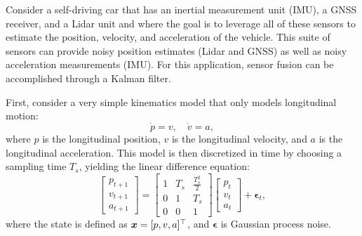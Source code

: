 \begin{example} \label{ex:car}
\theoremstyle{definition}
Consider a self-driving car that has an inertial measurement unit (IMU), a GNSS receiver, and a Lidar unit and where the goal is to leverage all of these sensors to estimate the position, velocity, and acceleration of the vehicle. This suite of sensors can provide noisy position estimates (Lidar and GNSS) as well as noisy acceleration measurements (IMU).
For this application, sensor fusion can be accomplished through a Kalman filter.

First, consider a very simple kinematics model that only models longitudinal motion:
\begin{equation*}
\dot{p} = v, \quad \dot{v} = a,
\end{equation*}
where $p$ is the longitudinal position, $v$ is the longitudinal velocity, and $a$ is the longitudinal acceleration. This model is then discretized in time by choosing a sampling time $T_s$, yielding the linear difference equation:
\begin{equation*}
\begin{bmatrix}
p_{t+1} \\ v_{t+1} \\ a_{t+1}
\end{bmatrix} = \begin{bmatrix}
1 & T_s & \frac{T_s^2}{2} \\
0 & 1 & T_s \\
0 & 0 & 1
\end{bmatrix}\begin{bmatrix}
p_{t} \\ v_{t} \\ a_{t}
\end{bmatrix} + \bm{\epsilon}_t,
\end{equation*}
where the state is defined as $\bm{x} = [p, v, a]^\top $, and $\bm{\epsilon}$ is Gaussian process noise.


\end{example}
